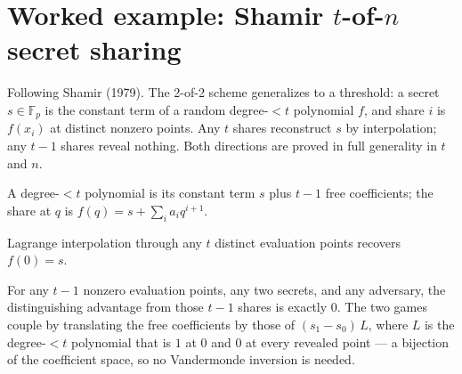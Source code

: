 \chapter{Worked example: Shamir $t$-of-$n$ secret sharing}

Following Shamir (1979). The 2-of-2 scheme generalizes to a threshold: a secret
$s \in \mathbb{F}_p$ is the constant term of a random degree-${<}t$ polynomial $f$,
and share $i$ is $f(x_i)$ at distinct nonzero points. Any $t$ shares reconstruct
$s$ by interpolation; any $t-1$ shares reveal nothing. Both directions are proved
in full generality in $t$ and $n$.

\begin{definition}
  \label{def:shamir-share}
  \leanok
  A degree-${<}t$ polynomial is its constant term $s$ plus $t-1$ free
  coefficients; the share at $q$ is $f(q) = s + \sum_i a_i q^{i+1}$.
\end{definition}

\begin{theorem}[Reconstruction]
  \label{thm:shamir-reconstruct}
  \leanok
  Lagrange interpolation through any $t$ distinct evaluation points recovers
  $f(0) = s$.
\end{theorem}

\begin{theorem}
  \label{thm:shamir-privacy}
  \leanok
  For any $t-1$ nonzero evaluation points, any two secrets, and any adversary, the
  distinguishing advantage from those $t-1$ shares is exactly $0$. The two games
  couple by translating the free coefficients by those of $(s_1 - s_0)\,L$, where
  $L$ is the degree-${<}t$ polynomial that is $1$ at $0$ and $0$ at every revealed
  point --- a bijection of the coefficient space, so no Vandermonde inversion is
  needed.
\end{theorem}
